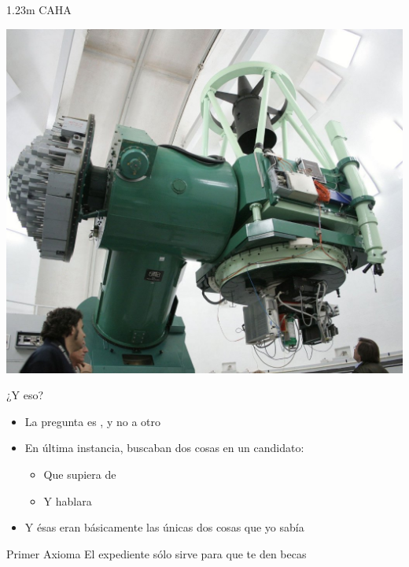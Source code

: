 \documentclass[14pt]{beamer}
\begin{document}
\begin{frame}{1.23m CAHA}
  \begin{center}
    \includegraphics[height=0.8\textheight]{pics/123m_CAHA_2.jpg}
  \end{center}
\end{frame}


\begin{frame}{¿Y eso?}
\begin{itemize}
  \item La pregunta es , y no a otro
  \item En última instancia, buscaban dos cosas en un candidato:
     \begin{itemize}
       \item Que supiera de 
       \item Y hablara 
     \end{itemize}
  \item Y ésas eran básicamente las únicas dos cosas que yo sabía
\end{itemize}
  \begin{alertblock}{\centering Primer Axioma}
    \centering El expediente sólo sirve para que te den becas
  \end{alertblock}
\end{frame}
\end{document}
